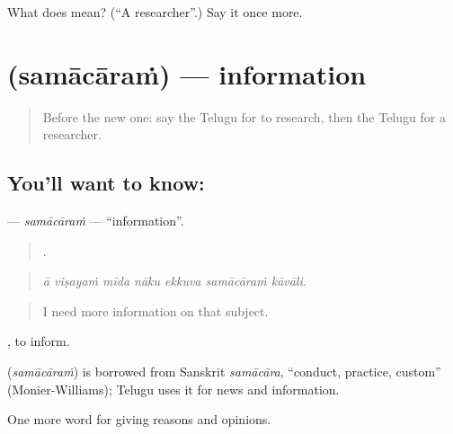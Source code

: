 \begin{tcolorbox}[breakable,colback=teal!4,colframe=teal!35!black,title={Before you move on}]
What does  mean? (\textquotedblleft{}A researcher\textquotedblright{}.) Say it once more.
\end{tcolorbox}
\section[\texorpdfstring{\te{సమాచారం} (samācāraṁ)}{సమాచారం (samācāraṁ)}]{ (samācāraṁ) — information}

\label{lesson:TE-C412-samacaram}



\begin{quote}
Before the new one: say the Telugu for to research, then the Telugu for a researcher.
\end{quote}

\subsection*{You'll want to know: }
\textbf{} — \emph{samācāraṁ} — \textquotedblleft{}information\textquotedblright{}.

\begin{quote}
      .
\end{quote}

\begin{quote}
\emph{ā viṣayaṁ mīda nāku ekkuva samācāraṁ kāvāli.}
\end{quote}

\begin{quote}
I need more information on that subject.
\end{quote}

 , to inform.

\begin{cousinweb}
\textbf{} (\emph{samācāraṁ}) is borrowed from Sanskrit \emph{samācāra}, \textquotedblleft{}conduct, practice, custom\textquotedblright{} (Monier-Williams); Telugu uses it for news and information.
\end{cousinweb}

\begin{grammarlens}[title={What you've built}]
One more word for giving reasons and opinions.
\end{grammarlens}

